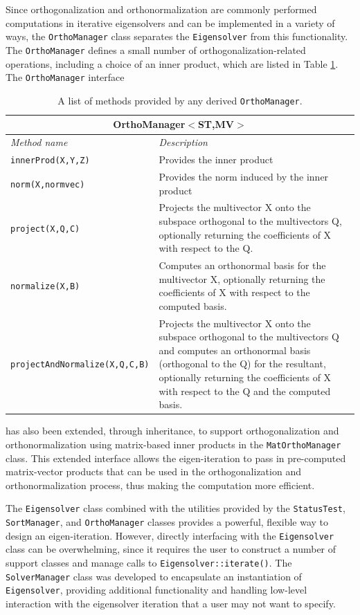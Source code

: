 \documentclass[acmtoms,acmnow]{acmtrans2m}
\newcommand{\aspace}[1]{\texttt{#1}}
\begin{document}
Since orthogonalization and orthonormalization are commonly performed
computations in iterative eigensolvers and can be implemented in a variety of ways, 
the \aspace{OrthoManager} class separates the \aspace{Eigensolver}
from this functionality. The \aspace{OrthoManager} defines a small number of
orthogonalization-related operations, including a choice of an inner
product, which are listed in Table \ref{tab:anasazi:orthomanager}.  The \aspace{OrthoManager} interface
\begin{table}[htp]
\begin{center}
\caption{A list of methods provided by any derived \aspace{OrthoManager}.} 
\label{tab:anasazi:orthomanager}
\begin{tabular}{| p{4cm} | p{6cm} |}
\hline
\multicolumn{2}{|c|}{\textbf{OrthoManager$<$ST,MV$>$}} \\\hline
\emph{Method name} & \emph{Description} \\
\hline
{\tt innerProd(X,Y,Z)} &
Provides the inner product \\
{\tt norm(X,normvec)} &
Provides the norm induced by the inner product \\
{\tt project(X,Q,C) } &
Projects the multivector X onto the subspace orthogonal to the multivectors Q, optionally returning the coefficients of 
X with respect to the Q.\\
{\tt normalize(X,B)} &
Computes an orthonormal basis for the multivector X, optionally returning the coefficients
of X with respect to the computed basis.\\
{\tt projectAndNormalize(X,Q,C,B)} &
Projects the multivector X onto the subspace orthogonal to the multivectors Q and computes an orthonormal basis (orthogonal to the Q) 
for the resultant, optionally returning the coefficients of X with respect to the Q and the computed basis.\\
\hline
\end{tabular}
\end{center}
\end{table}
has also been extended, through inheritance, to support orthogonalization and 
orthonormalization using matrix-based inner products in the \aspace{MatOrthoManager}
class. This extended interface allows the eigen-iteration to pass in pre-computed
matrix-vector products that can be used in the orthogonalization and orthonormalization
process, thus making the computation more efficient.

The \aspace{Eigensolver} class combined with the utilities provided by the \aspace{StatusTest},
\aspace{SortManager}, and \aspace{OrthoManager} classes provides a powerful, flexible way
to design an eigen-iteration.  However, directly interfacing with the \aspace{Eigensolver} class
can be overwhelming, since it requires the user to construct a number of support classes and 
manage calls to \verb!Eigensolver::iterate()!. The \aspace{SolverManager} class was developed to
encapsulate an instantiation of \aspace{Eigensolver}, providing additional functionality
and handling low-level interaction with the eigensolver iteration that a user may not want to
specify. 
\end{document}

